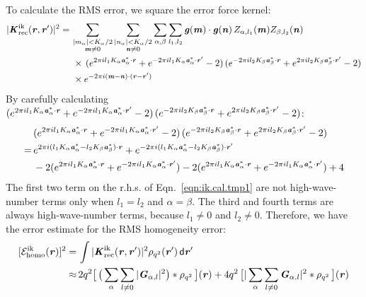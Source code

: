 \documentclass[aps,pre,preprint,unsortedaddress]{revtex4}
\renewcommand{\v}[1]{\textbf{\textit{#1}}}
\renewcommand{\d}[1]{\textsf{#1}}
\begin{document}
To calculate the RMS error, we square the error force kernel:
\begin{align}\nonumber
  \vert\v K^{\textrm{ik}}_{\textrm{rec}}(\v r,\v r')\vert^2
  =\,&
  \sum_{
    \begin{subarray}{c}
      \vert m_{\alpha}\vert < K_\alpha/2\\
      \v m\neq 0
    \end{subarray}}
  \sum_{
    \begin{subarray}{c}
      \vert n_{\alpha}\vert < K_\alpha/2\\
      \v n\neq 0
    \end{subarray}}
  \sum_{\alpha,\beta}
  \sum_{l_1,l_2}
  \v g(\v m)\cdot\v g(\v n)\,
  Z_{\alpha,l_1}(\v m)Z_{\beta,l_2}(\v n)
  \\\nonumber
  &\,
  \times
  \,(
  e^{2\pi i l_1 K_\alpha\v a^\ast_\alpha\cdot \v r} +
  e^{-2\pi i l_1 K_\alpha\v a^\ast_\alpha\cdot \v r'}
  - 2
  )
  \,(
  e^{-2\pi i l_2 K_\beta\v a^\ast_\beta\cdot \v r} +
  e^{2\pi i l_2 K_\beta\v a^\ast_\beta\cdot \v r'}
  - 2
  )\\
  &\,
  \times
  e^{-2\pi i(\v m-\v n)\cdot(\v r-\v r')}
\end{align}
By  carefully calculating
$  (
e^{2\pi i l_1 K_\alpha\v a^\ast_\alpha\cdot \v r} +
e^{-2\pi i l_1 K_\alpha\v a^\ast_\alpha\cdot \v r'}
- 2
)
\,(
e^{-2\pi i l_2 K_\beta\v a^\ast_\beta\cdot \v r} +
e^{2\pi i l_2 K_\beta\v a^\ast_\beta\cdot \v r'}
- 2
)$:
\begin{align}\nonumber
  &(
  e^{2\pi i l_1 K_\alpha\v a^\ast_\alpha\cdot \v r} +
  e^{-2\pi i l_1 K_\alpha\v a^\ast_\alpha\cdot \v r'}
  - 2
  )
  \,(
  e^{-2\pi i l_2 K_\beta\v a^\ast_\beta\cdot \v r} +
  e^{2\pi i l_2 K_\beta\v a^\ast_\beta\cdot \v r'}
  - 2
  ) \\ \nonumber
  = \,&
  e^{2\pi i(l_1K_\alpha\v a^\ast_\alpha - l_2K_\beta\v a^\ast_\beta)\cdot\v r} +
  e^{-2\pi i(l_1K_\alpha\v a^\ast_\alpha - l_2K_\beta\v a^\ast_\beta)\cdot\v r'} \\
  \label{eqn:ik.cal.tmp1}
  &-2(
  e^{2\pi i l_1 K_\alpha\v a^\ast_\alpha\cdot \v r} +
  e^{-2\pi i l_1 K_\alpha\v a^\ast_\alpha\cdot \v r'}
  ) 
  -2(
  e^{2\pi i l_1 K_\alpha\v a^\ast_\alpha\cdot \v r} +
  e^{-2\pi i l_1 K_\alpha\v a^\ast_\alpha\cdot \v r'}
  ) + 4
\end{align}
The first two term on the r.h.s. of Eqn.~\eqref{eqn:ik.cal.tmp1}
are not high-wave-number terms only when $l_1 = l_2$ and $\alpha=\beta$.
The third and fourth terms are always high-wave-number terms,
because $l_1\neq 0$ and $l_2\neq 0$.
Therefore, we have the error estimate
for the RMS homogeneity error:
\begin{align}\nonumber
  [\mathcal E^{\textrm{ik}}_{\textrm{homo}}(\v r)]^2
  = \,&
  \int
  \vert\v K^{\textrm{ik}}_{\textrm{rec}}(\v r,\v r')\vert^2
  \rho_{q^2}(\v r')\,\d d\v r' \\
  \approx\,&  
  2q^2
  \big[\,
  \big(
  \sum_{\alpha} \sum_{l\neq 0}
  \vert \v G_{\alpha,l}\vert^2
  \big)
  \ast \rho_{q^2}
  \,\big] (\v r)
  +
  4q^2\,
  \big[
  \vert
  \sum_{\alpha} \sum_{l\neq 0}  
  \v G_{\alpha,l}
  \vert^2
  \ast \rho_{q^2}\,
  \big] (\v r) 
\end{align}
\end{document}
